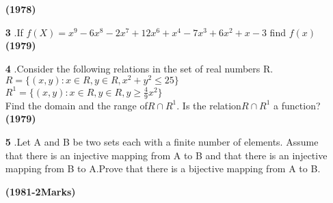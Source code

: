 \documentclass[journal,12pt,twocolumn]{IEEEtran}
\theoremstyle{remark}
\begin{document}
\begin{enumerate}
     \hfill\textbf{(1978)}\\
     \item[\textbf{3}].If $f(X)=x^9-6x^8-2x^7+12x^6+x^4-7x^3+6x^2+x-3$ find $f(x)$
     \hfill\textbf{(1979)}\\

     \item[\textbf{4}].Consider the following relations in the set of real numbers R.\\
      $R=\{(x,y):x\in R,y\in R,x^2+y^2\le25\}$\\
      $R^1=\{(x,y):x\in R,y\in R,y\ge\frac{4}{9}x^2\}$\\
      Find the domain and the range of$ R\cap R^1.$ Is the relation$ R\cap R^1$ a function? 
      \hfill\textbf{(1979)}\\

      \item[\textbf{5}].Let A and B be two sets each with a finite number of elements. Assume that there is an injective mapping from A to B and that there is an injective mapping from B to A.Prove that there is a bijective mapping from A to B.

 \hfill\textbf{(1981-2Marks)}\\
 \end{enumerate}
\end{document}
